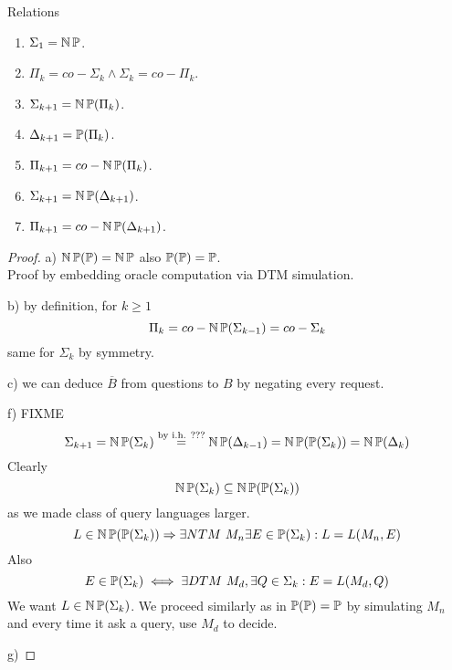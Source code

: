 \begin{theorem} Relations
	\begin{enumerate}[label=\alph*)]
		\item $\Sigma_1 = \TNP $.
		\item $\Pi_k = co-\Sigma_k \land \Sigma_k = co-\Pi_k$.
		\item $\Sigma_{k + 1} = \TNP(\Pi_k)$.
		\item $\Delta_{k + 1} = \TP(\Pi_k)$.
		\item $\Pi_{k + 1} = co-\TNP(\Pi_k)$.
		\item $\Sigma_{k + 1} = \TNP(\Delta_{k + 1})$.
		\item $\Pi_{k + 1} = co-\TNP(\Delta_{k + 1})$.
	\end{enumerate}
\end{theorem}
\begin{proof}
	a) $\TNP(\TP) = \TNP$ also $\TP(\TP) = \TP$.\\
	Proof by embedding oracle computation via DTM simulation.

	b) by definition, for $k \geq 1$
	\[ \Pi_k = co-\TNP(\Sigma_{k - 1}) = co-\Sigma_k \]
	same for $\Sigma_k$ by symmetry.

	c) we can deduce $\overline{B}$ from questions to $B$ by negating every request.


	f) FIXME
	\[ \Sigma_{k + 1} = \TNP(\Sigma_k) \stackrel{\text{by i.h. ???}}{=} \TNP(\Delta_{k - 1}) = \TNP(\TP(\Sigma_k)) = \TNP(\Delta_k) \]
	Clearly
	\[ \TNP(\Sigma_k) \subseteq \TNP(\TP(\Sigma_k)) \]
	as we made class of query languages larger.
	\[ L \in \TNP(\TP(\Sigma_k)) \Rightarrow \exists NTM\ M_n \exists E \in \TP(\Sigma_k): L = L(M_n, E) \]
	Also
	\[ E \in \TP(\Sigma_k) \iff \exists DTM\ M_d, \exists Q \in \Sigma_k: E = L(M_d, Q) \]
	We want $L \in \TNP(\Sigma_k)$.
	We proceed similarly as in $\TP(\TP) = \TP$ by simulating $M_n$ and every time it ask a query, use $M_d$ to decide.

	g)

\end{proof}

